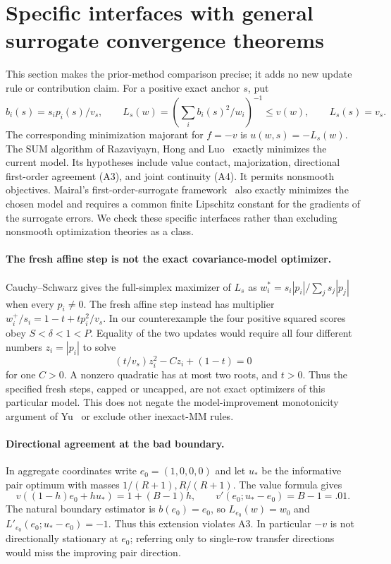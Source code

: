 \section{Specific interfaces with general surrogate convergence theorems}
\label{app:mm-interface}

This section makes the prior-method comparison precise; it adds no new update
rule or contribution claim. For a positive exact anchor $s$, put
\[
 b_i(s)=s_ip_i(s)/v_s,\qquad
 L_s(w)=\left(\sum_i b_i(s)^2/w_i\right)^{-1}\le v(w),
 \qquad L_s(s)=v_s.
\]
The corresponding minimization majorant for $f=-v$ is $u(w,s)=-L_s(w)$.
The SUM algorithm of Razaviyayn, Hong and Luo~\cite[Assumption~1 and
Theorem~1, arXiv v1, pp.~4--8]{razaviyayn2013} exactly minimizes the
current model. Its hypotheses include value contact, majorization,
directional first-order agreement (A3), and joint continuity (A4).
It permits nonsmooth objectives. Mairal's first-order-surrogate
framework~\cite[Definition~2.2, Algorithm~1 and Proposition~2.5]{mairal2015}
also exactly minimizes the chosen model and requires a common finite
Lipschitz constant for the gradients of the surrogate errors.
We check these specific interfaces rather than excluding nonsmooth
optimization theories as a class.

\paragraph{The fresh affine step is not the exact covariance-model optimizer.}
Cauchy--Schwarz gives the full-simplex maximizer of $L_s$ as
$w_i^*=s_i|p_i|/\sum_j s_j|p_j|$ when every $p_i\ne0$.
The fresh affine step instead has multiplier
$w_i^+/s_i=1-t+tp_i^2/v_s$. In our counterexample the four positive squared
scores obey $S<\delta<1<P$. Equality of the two updates would require all
four different numbers $z_i=|p_i|$ to solve
\[
 (t/v_s)z_i^2-Cz_i+(1-t)=0
\]
for one $C>0$. A nonzero quadratic has at most two roots, and $t>0$.
Thus the specified fresh steps, capped or uncapped, are not exact optimizers
of this particular model. This does not negate the model-improvement
monotonicity argument of Yu~\cite{yu2010} or exclude other inexact-MM rules.

\paragraph{Directional agreement at the bad boundary.}
In aggregate coordinates write $e_0=(1,0,0,0)$ and let $u_*$ be the informative
pair optimum with masses $1/(R+1),R/(R+1)$. The value formula gives
\[
 v((1-h)e_0+hu_*)=1+(B-1)h,\qquad v'(e_0;u_*-e_0)=B-1=.01.
\]
The natural boundary estimator is $b(e_0)=e_0$, so
$L_{e_0}(w)=w_0$ and $L'_{e_0}(e_0;u_*-e_0)=-1$.
Thus this extension violates A3. In particular $-v$ is not directionally
stationary at $e_0$; referring only to single-row transfer directions would
miss the improving pair direction.


